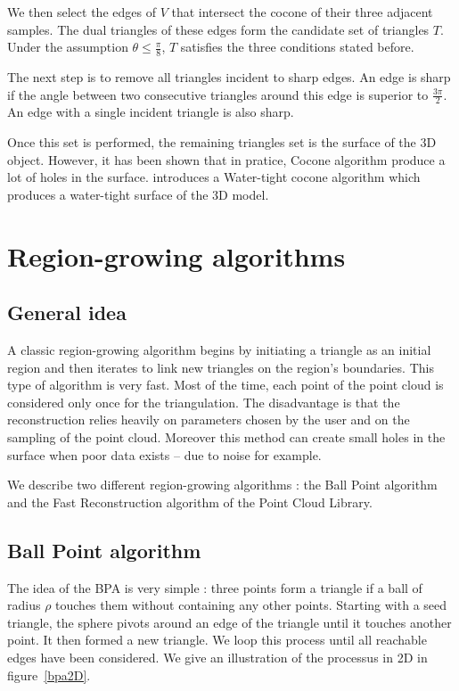 \documentclass[12pt]{article}
\begin{document}
We then select the edges of $V$ that intersect the cocone of their three adjacent samples. The dual triangles of these edges form the candidate set of triangles $T$. Under the assumption $\theta\le\frac{\pi}{8}$, $T$ satisfies the three conditions stated before.

The next step is to remove all triangles incident to sharp edges. An edge is sharp if the angle between two consecutive triangles around this edge is superior to $\frac{3\pi}{2}$. An edge with a single incident triangle is also sharp.

Once this set is performed, the remaining triangles set is the surface of the 3D object. However, it has been shown that in pratice, Cocone algorithm produce a lot of holes in the surface. \cite{Tightcocone} introduces a Water-tight cocone algorithm which produces a water-tight surface of the 3D model.


\newpage

\section{Region-growing algorithms}
\subsection{General idea}
A classic region-growing algorithm begins by initiating a triangle as an initial region and then iterates to link new triangles on the region's boundaries. This type of algorithm is very fast. Most of the time, each point of the point cloud is considered only once for the triangulation. The disadvantage is that the reconstruction relies heavily on parameters chosen by the user and on the sampling of the point cloud. Moreover this method can create small holes in the surface when poor data  exists -- due to noise for example. 

We describe two different region-growing algorithms : the Ball Point algorithm and the Fast Reconstruction algorithm of the Point Cloud Library.

\subsection{Ball Point algorithm}
The idea of the BPA is very simple : three points form a triangle if a ball of radius $\rho$ touches them without containing any other points. Starting with a seed triangle, the sphere pivots around an edge of the triangle until it touches another point. It then formed a new triangle. We loop this process until all reachable edges have been considered. We give an illustration of the processus in 2D in figure~\ref{bpa2D}.
\end{document}
